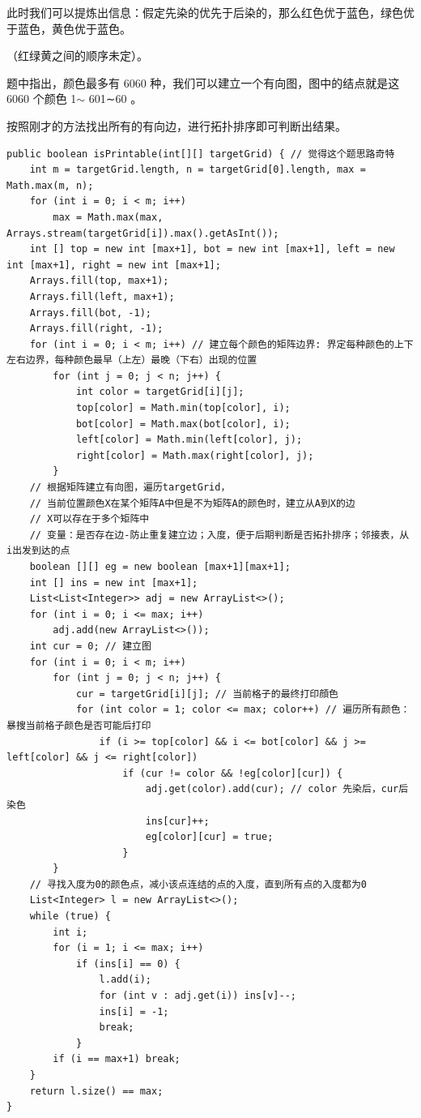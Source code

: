 \documentclass[9pt, b5paaper]{book}
\begin{document}
此时我们可以提炼出信息：假定先染的优先于后染的，那么红色优于蓝色，绿色优于蓝色，黄色优于蓝色。

（红绿黄之间的顺序未定）。

题中指出，颜色最多有 6060 种，我们可以建立一个有向图，图中的结点就是这 6060 个颜色 1$\sim$ 601∼60 。

按照刚才的方法找出所有的有向边，进行拓扑排序即可判断出结果。

\begin{verbatim}
public boolean isPrintable(int[][] targetGrid) { // 觉得这个题思路奇特
    int m = targetGrid.length, n = targetGrid[0].length, max = Math.max(m, n);
    for (int i = 0; i < m; i++) 
        max = Math.max(max, Arrays.stream(targetGrid[i]).max().getAsInt());
    int [] top = new int [max+1], bot = new int [max+1], left = new int [max+1], right = new int [max+1];
    Arrays.fill(top, max+1);
    Arrays.fill(left, max+1);
    Arrays.fill(bot, -1);
    Arrays.fill(right, -1);
    for (int i = 0; i < m; i++) // 建立每个颜色的矩阵边界: 界定每种颜色的上下左右边界，每种颜色最早（上左）最晚（下右）出现的位置
        for (int j = 0; j < n; j++) {
            int color = targetGrid[i][j];
            top[color] = Math.min(top[color], i);
            bot[color] = Math.max(bot[color], i);
            left[color] = Math.min(left[color], j);
            right[color] = Math.max(right[color], j);
        }
    // 根据矩阵建立有向图，遍历targetGrid，
    // 当前位置颜色X在某个矩阵A中但是不为矩阵A的颜色时，建立从A到X的边
    // X可以存在于多个矩阵中
    // 变量：是否存在边-防止重复建立边；入度，便于后期判断是否拓扑排序；邻接表，从i出发到达的点
    boolean [][] eg = new boolean [max+1][max+1];
    int [] ins = new int [max+1];
    List<List<Integer>> adj = new ArrayList<>();
    for (int i = 0; i <= max; i++) 
        adj.add(new ArrayList<>());
    int cur = 0; // 建立图
    for (int i = 0; i < m; i++) 
        for (int j = 0; j < n; j++) {
            cur = targetGrid[i][j]; // 当前格子的最终打印顔色
            for (int color = 1; color <= max; color++) // 遍历所有颜色：暴搜当前格子颜色是否可能后打印
                if (i >= top[color] && i <= bot[color] && j >= left[color] && j <= right[color])
                    if (cur != color && !eg[color][cur]) {
                        adj.get(color).add(cur); // color 先染后，cur后染色
                        ins[cur]++;
                        eg[color][cur] = true;
                    }
        }
    // 寻找入度为0的颜色点，减小该点连结的点的入度，直到所有点的入度都为0
    List<Integer> l = new ArrayList<>();
    while (true) {
        int i;
        for (i = 1; i <= max; i++) 
            if (ins[i] == 0) {
                l.add(i);
                for (int v : adj.get(i)) ins[v]--;
                ins[i] = -1;
                break;
            }
        if (i == max+1) break;
    }
    return l.size() == max;
}
\end{verbatim}
\end{document}
